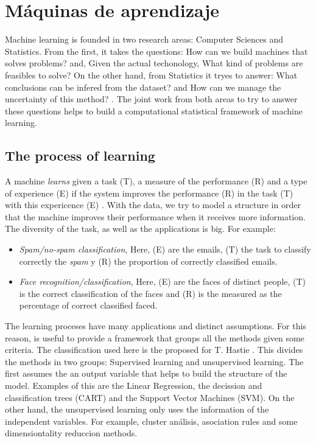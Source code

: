 \chapter{Máquinas de aprendizaje}
\label{ch:chapter1}
 
Machine learning is founded in two research areas: Computer Sciences and Statistics. From the first, it takes the questions: How can we build machines that solves problems? and, Given the actual techonology, What kind of problems are feasibles to solve? On the other hand, from Statistics it tryes to answer: What conclusions can be infered from the dataset? and How can we manage the uncertainty of this method? \cite{mitchell2006discipline}. The joint work from both areas to try to answer these questions helps to build a computational statistical framework of machine learning.

\section{The process of learning}

A machine \textit{learns} given a task (T), a measure of the performance (R) and a type of experience (E) if the system improves the performance (R) in the task (T) with this expericence (E) \cite{mitchell2006discipline}. With the data, we try to model a structure in order that the machine improves their performance when it receives more information. The diversity of the task, as well as the applications is big. For example:

\begin{itemize} 

\item \textit{Spam/no-spam classification}, Here, (E) are the emails, (T) the task to classify correctly the \textit{spam} y (R) the proportion of correctly classified emails.

\item \textit{Face recognition/classification}, Here, (E) are the faces of distinct people, (T) is the correct classification of the faces and (R) is the measured as the percentage of correct classified faced.

\end{itemize} 

The learning proceses have many applications and distinct assumptions. For this reason, is useful to provide a framework that groups all the methods given some criteria. The classification used here is the proposed for T. Hastie \cite{hastie2009elements}. This divides the methods in two groups: Supervised learning and unsupervised learning. The first assumes the an output variable that helps to build the structure of the model. Examples of this are the Linear Regression, the decission and classification trees (CART) and the Support Vector Machines (SVM). On the other hand, the unsupervised learning only uses the information of the independent variables. For example, cluster análisis, asociation rules and some dimensiontality reduccion methods.

